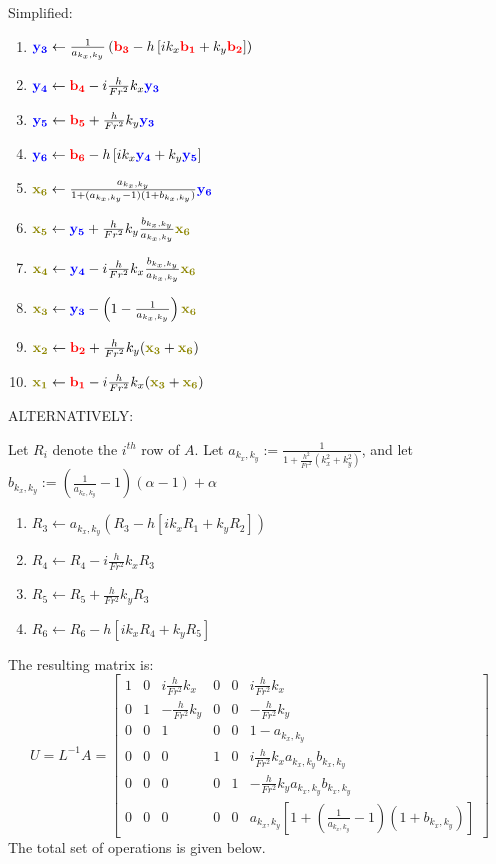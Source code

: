 \documentclass[10pt]{article}
\newcommand{\mbfb}[1]{{\color{blue}\mathbf{#1}}}
\newcommand{\mbfr}[1]{{\color{red}\mathbf{#1}}}
\newcommand{\mbfg}[1]{{\color{olive}\mathbf{#1}}}
\begin{document}
Simplified:

\begin{enumerate}
	\item $\mbfb{y_3}\gets \frac{1}{a_{k_x, k_y}} \left(\mbfr{b_3} -h \left[i k_x \mbfr{b_1} + k_y \mbfr{b_2}\right]\right)$ 
	\item $\mbfb{y_4} \gets \mbfr{b_4} - i \frac{h}{Fr^2}k_x \mbfb{y_3}$
	\item $\mbfb{y_5} \gets \mbfr{b_5} + \frac{h}{Fr^2}k_y \mbfb{y_3}$
	\item $\mbfb{y_6} \gets \mbfr{b_6} -h \left[ik_x \mbfb{y_4} +k_y\mbfb{y_5}\right]$
	\item $\mbfg{x_6} \gets \frac{a_{k_x, k_y}}{1+(a_{k_x, k_y}-1)(1+b_{k_x, k_y})}\mbfb{y_6}$
	\item $\mbfg{x_5} \gets \mbfb{y_5} +\frac{h}{Fr^2}k_y \frac{b_{k_x,k_y}}{a_{k_x,k_y}}\mbfg{x_6}$
	\item $\mbfg{x_4} \gets \mbfb{y_4} - i \frac{h}{Fr^2}k_x\frac{b_{k_x,k_y}}{a_{k_x,k_y}}\mbfg{x_6}$
	\item $\mbfg{x_3} \gets \mbfb{y_3} - \left(1-\frac{1}{a_{k_x,k_y}}\right)\mbfg{x_6}$
	\item $\mbfg{x_2}\gets \mbfr{b_2} + \frac{h}{Fr^2}k_y(\mbfg{x_3}+\mbfg{x_6})$
	\item $\mbfg{x_1} \gets \mbfr{b_1} - i \frac{h}{Fr^2}k_x(\mbfg{x_3}+\mbfg{x_6})$
\end{enumerate}

ALTERNATIVELY:

 Let $R_i$ denote the $i^{th}$ row of $A$. Let $a_{k_x, k_y}:= \frac{1}{1+\frac{h^2}{Fr^2}(k_x^2+k_y^2)}$, and let $b_{k_x, k_y}:= (\frac{1}{a_{k_x, k_y}}-1)(\alpha - 1)+\alpha$
\begin{enumerate}
	\item $R_3 \gets a_{k_x, k_y} \left(R_3 -h \left[i k_x R_1 + k_y R_2\right]\right)$
	\item $R_4 \gets R_4 - i \frac{h}{Fr^2}k_x R_3$
	\item $R_5 \gets R_5 + \frac{h}{Fr^2}k_y R_3$
	\item $R_6 \gets R_6 -h \left[ik_x R_4 +k_y R_5\right]$
\end{enumerate}
The resulting matrix is: \[U = L^{-1}A = 
\begin{bmatrix}
1 & 0 & i \frac{h}{Fr^2}k_x & 0 & 0 & i \frac{h}{Fr^2}k_x \\
0 & 1 & -\frac{h}{Fr^2}k_y & 0 & 0 & -\frac{h}{Fr^2}k_y \\
0 & 0 & 1 & 0 & 0 & 1- a_{k_x, k_y} \\ 
0 & 0 & 0 & 1 & 0 & i \frac{h}{Fr^2}k_x a_{k_x, k_y}b_{k_x,k_y} \\
0 & 0 & 0 & 0 & 1 & -\frac{h}{Fr^2}k_y  a_{k_x, k_y}b_{k_x,k_y}\\
0 & 0 & 0 & 0 & 0 & a_{k_x, k_y}[1+(\frac{1}{a_{k_x, k_y}}-1)(1+b_{k_x, k_y})]
\end{bmatrix}\] 
The total set of operations is given below.
\end{document}
